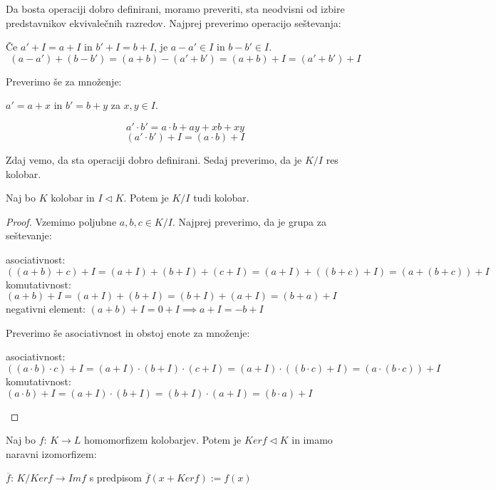 \documentclass[11pt, a4paper]{article}
\begin{document}
    Da bosta operaciji dobro definirani, moramo preveriti, sta neodvisni od izbire predstavnikov ekvivalečnih razredov. Najprej preverimo operacijo seštevanja:
    \par
    Če \(a' + I = a + I\) in \(b' + I = b + I\), je \(a - a' \in I\) in \(b - b' \in I\).
    \[(a - a') + (b - b') = (a + b) - (a' + b') = (a + b) + I = (a' + b') + I\]
    
    Preverimo še za množenje:
    \begin{center}
        \(a' = a + x\) in \(b' = b + y\) za \(x,y \in I\).
    \end{center}
    
    \[a' \cdot b' = a \cdot b + ay + xb + xy\]
    \[(a' \cdot b') + I = (a \cdot b) + I\]

    Zdaj vemo, da sta operaciji dobro definirani. Sedaj preverimo, da je \(K / I\) res kolobar.

    \begin{proposition}
        Naj bo \(K\) kolobar in \(I \triangleleft K\). Potem je \(K / I\) tudi kolobar.
    \end{proposition}

    \begin{proof}
        Vzemimo poljubne \(a,b,c \in K / I\). Najprej preverimo, da je grupa za seštevanje:
        \begin{center}
            asociativnost: \(((a+b) + c) + I = (a+I) + (b+I) + (c+I) = (a+I) + ((b+c) + I) = (a + (b+c)) + I\) \\
            komutativnost: \((a+b) + I = (a+I) + (b+I) = (b+I) + (a+I) = (b+a) + I\) \\
            negativni element: \((a+b) + I = 0 + I \implies a + I = -b + I\)
        \end{center} 

        Preverimo še asociativnost in obstoj enote za množenje:
        \begin{center}
            asociativnost: \(((a \cdot b) \cdot c) + I = (a+I) \cdot (b+I) \cdot (c+I) = (a+I) \cdot ((b \cdot c) + I) = (a \cdot (b \cdot c)) + I\) \\
            komutativnost: \((a \cdot b) + I = (a+I) \cdot (b+I) = (b+I) \cdot (a+I) = (b \cdot a) + I\) \\
        \end{center}
    \end{proof}

    \begin{theorem}
        Naj bo \(f\): \(K \to L\) homomorfizem kolobarjev. Potem je \(Ker f \triangleleft K\) in imamo naravni izomorfizem:
        \begin{center}
            \(\overline{f}\): \(K / Ker f \to Im f\) s predpisom \(\overline{f}(x + Ker f) := f(x)\)
        \end{center}
    \end{theorem}
\end{document}
